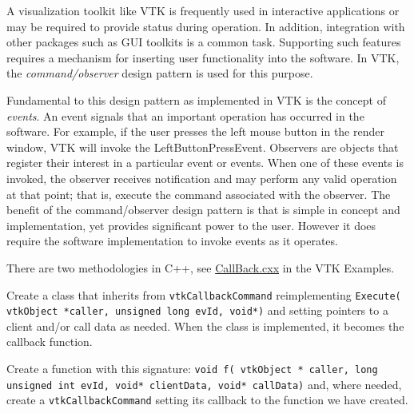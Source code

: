 \begin{description}[leftmargin=0cm,labelindent=0cm]
\item[Events and Observers.]
\label{sub:examples_events_observers}

A visualization toolkit like VTK is frequently used in interactive applications or may be required to provide status during operation. In addition, integration with other packages such as GUI toolkits is a common task. Supporting such features requires a mechanism for inserting user functionality into the software. In VTK, the \emph{command/observer}
 design pattern \cite{Gamma95} is used for this purpose.

Fundamental to this design pattern as implemented in VTK is the concept of \emph{events}. An event signals that an important operation has occurred in the software. For example, if the user presses the left mouse button in the render window, VTK will invoke the LeftButtonPressEvent. Observers are objects that register their interest in a particular event or events. When one of these events is invoked, the observer receives notification and may perform any valid operation at that point; that is, execute the command associated with the observer. The benefit of the command/observer design pattern is that is simple in concept and implementation, yet provides significant power to the user. However it does require the software implementation to invoke events as it operates.

\begin{description}[leftmargin=0.5cm,labelindent=0.5cm]

\item[C++]There are two methodologies in C++, see \href{https://lorensen.github.io/VTKExamples/site/Cxx/Interaction/CallBack/}{CallBack.cxx} in the VTK Examples.

\begin{description}[leftmargin=1.0cm,labelindent=1.0cm]
\item[Using a class:] Create a class that inherits from \texttt{vtkCallbackCommand} reimplementing \texttt{Execute( vtkObject *caller, unsigned long evId, void*)} and setting pointers to a client and/or call data as needed. When the class is implemented, it becomes the callback function.
\item[Using a function:] Create a function with this signature: \texttt{void f( vtkObject * caller, long unsigned int evId, void* clientData, void* callData)} and, where needed, create a \texttt{vtkCallbackCommand} setting its callback to the function we have created.
\end{description}


\end{description}
\end{description}
